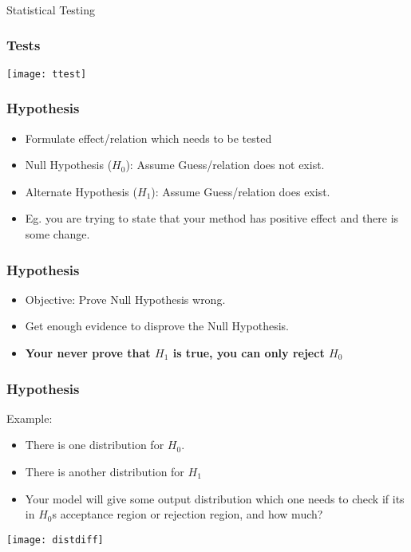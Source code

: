 \begin{frame}[fragile]\frametitle{}
\begin{center}
{\Large Statistical Testing}
\end{center}
\end{frame}

\begin{frame}[fragile]\frametitle{Tests}
\begin{center}
\texttt{[image: ttest]}
\end{center}
\end{frame}


\begin{frame}[fragile]\frametitle{Hypothesis}
\begin{itemize}
\item Formulate effect/relation which needs to be tested
\item Null Hypothesis ($H_0$): Assume Guess/relation does not exist.
\item Alternate Hypothesis ($H_1$): Assume Guess/relation does exist. 
\item Eg. you are trying to state that your method has positive effect and there is some change.
\end{itemize}
\end{frame}

\begin{frame}[fragile]\frametitle{Hypothesis}
\begin{itemize}
\item Objective: Prove Null Hypothesis wrong.
\item Get enough evidence to disprove the Null Hypothesis.
\item {\bf Your never prove that $H_1$ is true, you can only reject $H_0$}
\end{itemize}
\end{frame}

\begin{frame}[fragile]\frametitle{Hypothesis}
Example:
\begin{itemize}
\item There is one distribution for $H_0$. 
\item There is another distribution for $H_1$
\item Your model will give some output distribution which one needs to check if its in $H_0$s acceptance region or rejection region, and how much?
\end{itemize}
\begin{center}
\texttt{[image: distdiff]}
\end{center}
\end{frame}


